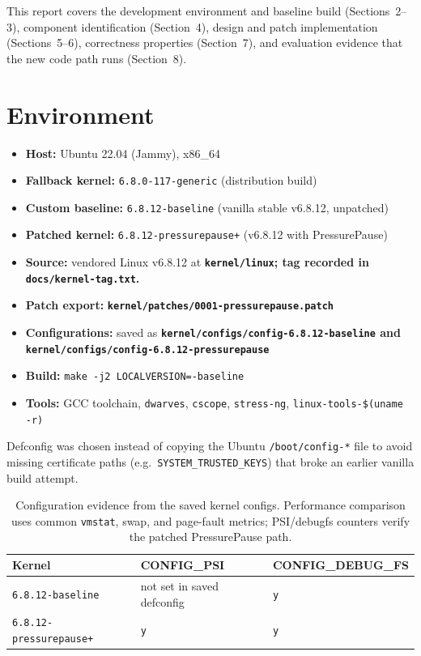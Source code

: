 \documentclass[12pt,a4paper]{article}
\newcommand{\srcfile}[1]{\begingroup\bfseries\color{aublue}\nolinkurl{#1}\endgroup}
\begin{document}
This report covers the development environment and baseline build (Sections~2--3), component identification (Section~4), design and patch implementation (Sections~5--6), correctness properties (Section~7), and evaluation evidence that the new code path runs (Section~8).

\section{Environment}

\begin{itemize}[leftmargin=1.2cm]
    \item \textbf{Host:} Ubuntu 22.04 (Jammy), x86\_64
    \item \textbf{Fallback kernel:} \texttt{6.8.0-117-generic} (distribution build)
    \item \textbf{Custom baseline:} \texttt{6.8.12-baseline} (vanilla stable v6.8.12, unpatched)
    \item \textbf{Patched kernel:} \texttt{6.8.12-pressurepause+} (v6.8.12 with PressurePause)
    \item \textbf{Source:} vendored Linux v6.8.12 at \srcfile{kernel/linux}; tag recorded in \srcfile{docs/kernel-tag.txt}.
    \item \textbf{Patch export:} \srcfile{kernel/patches/0001-pressurepause.patch}
    \item \textbf{Configurations:} saved as \srcfile{kernel/configs/config-6.8.12-baseline} and \srcfile{kernel/configs/config-6.8.12-pressurepause}
    \item \textbf{Build:} \texttt{make -j2 LOCALVERSION=-baseline}
    \item \textbf{Tools:} GCC toolchain, \texttt{dwarves}, \texttt{cscope}, \texttt{stress-ng}, \texttt{linux-tools-\$(uname -r)}
\end{itemize}

Defconfig was chosen instead of copying the Ubuntu \texttt{/boot/config-*} file to avoid missing certificate paths (e.g.\ \texttt{SYSTEM\_TRUSTED\_KEYS}) that broke an earlier vanilla build attempt.

\begin{table}[H]
\centering
\begin{tabular}{@{}lll@{}}
\toprule
\textbf{Kernel} & \textbf{CONFIG\_PSI} & \textbf{CONFIG\_DEBUG\_FS} \\
\midrule
\texttt{6.8.12-baseline} & not set in saved defconfig & \texttt{y} \\
\texttt{6.8.12-pressurepause+} & \texttt{y} & \texttt{y} \\
\bottomrule
\end{tabular}
\caption{Configuration evidence from the saved kernel configs. Performance comparison uses common \texttt{vmstat}, swap, and page-fault metrics; PSI/debugfs counters verify the patched PressurePause path.}
\end{table}
\end{document}
